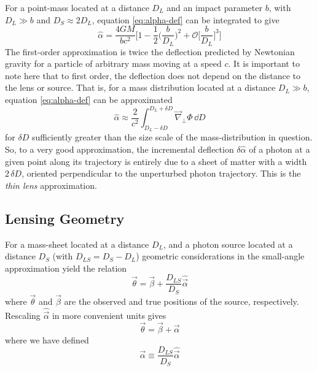 For a point-mass located at a distance $D_L$ and an impact parameter $b$, with $D_L \gg b$ and $D_S \approx 2D_L$, equation \ref{eq:alpha-def} can be integrated to give
\begin{equation}
  \hat{\alpha} = \frac{4GM}{bc^2}\Bigg[1 - \frac{1}{2}\bigg(\frac{b}{D_L}\bigg)^2 + \mathcal{O}\bigg[\frac{b}{D_L}\bigg]^3 \Bigg]
\end{equation}
The first-order approximation is twice the deflection predicted by Newtonian gravity for a particle of arbitrary mass moving at a speed $c$.  It is important to note here that to first order, the deflection does not depend on the distance to the lens or source.  That is, for a mass distribution located at a distance $D_L \gg b$, equation \ref{eq:alpha-def} can be approximated
\begin{equation}
  \label{eq:alpha-def-approx}
  \hat{\alpha} \approx \frac{2}{c^2}\int_{D_L-\delta D}^{D_L+\delta D} \vec{\nabla}_\perp\Phi\,\dd D
\end{equation}
for $\delta D$ sufficiently greater than the size scale of the mass-distribution in question.
So, to a very good approximation, the incremental deflection $\delta \hat{\alpha}$ of a photon at a given point along its trajectory is entirely due to a sheet of matter with a width $2\,\delta D$, oriented perpendicular to the unperturbed photon trajectory.  This is the {\it thin lens} approximation.

\subsection{Lensing Geometry}

For a mass-sheet located at a distance $D_L$, and a photon source located at a distance $D_S$ (with $D_{LS} = D_S - D_L$) geometric considerations in the small-angle approximation yield the relation
\begin{equation}
  \vec{\theta} = \vec{\beta} + \frac{D_{LS}}{D_S}\hat{\vec{\alpha}}
\end{equation}
where $\vec{\theta}$ and $\vec{\beta}$ are the observed and true positions of the source, respectively.  Rescaling $\hat{\vec{\alpha}}$ in more convenient units gives
\begin{equation}
  \label{eq:mapping}
  \vec{\theta} = \vec{\beta} + \vec{\alpha}
\end{equation}
where we have defined
\begin{equation}
  \label{eq:alpha-def2}
  \vec{\alpha} \equiv \frac{D_{LS}}{D_S}\hat{\vec{\alpha}}
\end{equation}

